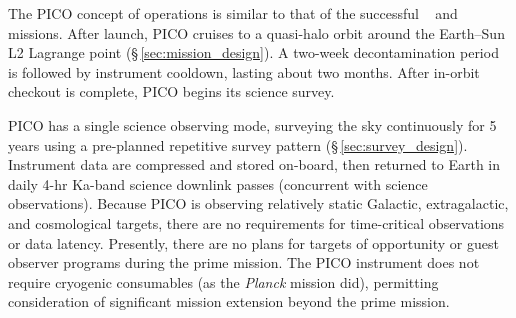 The PICO concept of operations is similar to that of the successful \wmap~\citep{Bennett2003} and \planck~\citep{Tauber2010} missions. After launch, PICO cruises to a quasi-halo orbit around the Earth--Sun L2 Lagrange point (\S\,\ref{sec:mission_design}). A two-week decontamination period is followed by instrument cooldown, lasting about two months. After in-orbit checkout is complete, PICO begins its science survey.

PICO has a single science observing mode, surveying the sky continuously for 5 years using a pre-planned repetitive survey pattern (\S\,\ref{sec:survey_design}). Instrument data are compressed and stored on-board, then returned to Earth in daily 4-hr Ka-band science downlink passes (concurrent with science observations). Because PICO is observing relatively static Galactic, extragalactic, and cosmological targets, there are no requirements for time-critical observations or data latency. Presently, there are no plans for targets of opportunity or guest observer programs during the prime mission. The PICO instrument does not require cryogenic consumables (as the \textit{Planck} mission did), permitting consideration of significant mission extension beyond the prime mission.

